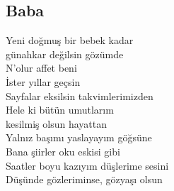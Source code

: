 \subsection{Baba}

Yeni doğmuş bir bebek kadar \\
günahkar değilsin gözümde \\
N'olur affet beni \\
İster yıllar geçsin \\
Sayfalar eksilsin takvimlerimizden \\
Hele ki bütün umutlarım \\
kesilmiş olsun hayattan \\
Yalnız başımı yaslayayım göğsüne \\
Bana şiirler oku eskisi gibi \\
Saatler boyu kazıyım düşlerime sesini \\
Düşünde gözleriminse, gözyaşı olsun